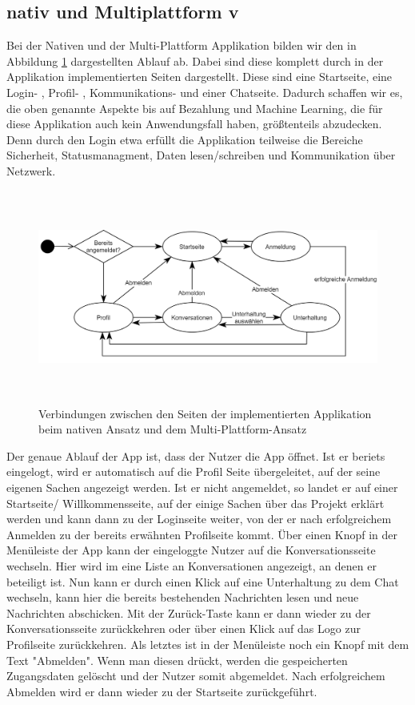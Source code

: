 \subsection{nativ und Multiplattform v}
Bei der Nativen und der Multi-Plattform Applikation bilden wir den in Abbildung \ref{fig:pageflow} dargestellten Ablauf ab. Dabei sind diese komplett durch in der Applikation implementierten Seiten dargestellt. Diese sind eine Startseite, eine Login- , Profil- , Kommunikations- und einer Chatseite. Dadurch schaffen wir es, die oben genannte Aspekte bis auf Bezahlung und Machine Learning, die für diese Applikation auch kein Anwendungsfall haben, größtenteils abzudecken. Denn durch den Login etwa erfüllt die Applikation teilweise die Bereiche Sicherheit, Statusmanagment, Daten lesen/schreiben und Kommunikation über Netzwerk. 

\begin{figure}[ht]
  \centering
  \includegraphics[height=7cm,keepaspectratio]{images/Pageflow_native_flutter.png} 
  \caption{Verbindungen zwischen den Seiten der implementierten Applikation beim nativen Ansatz und dem Multi-Plattform-Ansatz}
  \label{fig:pageflow}
\end{figure}

Der genaue Ablauf der App ist, dass der Nutzer die App öffnet. Ist er beriets eingelogt, wird er automatisch auf die Profil Seite übergeleitet, auf der seine eigenen Sachen angezeigt werden. Ist er nicht angemeldet, so landet er auf einer Startseite/ Willkommensseite, auf der einige Sachen über das Projekt erklärt werden und kann dann zu der Loginseite weiter, von der er nach erfolgreichem Anmelden zu der bereits erwähnten Profilseite kommt. Über einen Knopf in der Menüleiste der App kann der eingeloggte Nutzer auf die Konversationsseite wechseln. Hier wird im eine Liste an Konversationen angezeigt, an denen er beteiligt ist. Nun kann er durch einen Klick auf eine Unterhaltung zu dem Chat wechseln, kann hier die bereits bestehenden Nachrichten lesen und neue Nachrichten abschicken. Mit der Zurück-Taste kann er dann wieder zu der Konversationsseite zurückkehren oder über einen Klick auf das Logo zur Profilseite zurückkehren. Als letztes ist in der Menüleiste noch ein Knopf mit dem Text "Abmelden". Wenn man diesen drückt, werden die gespeicherten Zugangsdaten gelöscht und der Nutzer somit abgemeldet. Nach erfolgreichem Abmelden wird er dann wieder zu der Startseite zurückgeführt.


